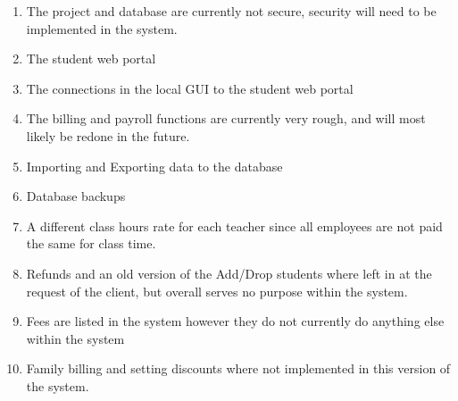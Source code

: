 \begin{enumerate}
\item The project and database are currently not secure, security will need to be implemented in the system.
\item The student web portal
\item The connections in the local GUI to the student web portal
\item The billing and payroll functions are currently very rough, and will most likely be redone in the future.
\item Importing and Exporting data to the database
\item Database backups
\item A different class hours rate for each teacher since all employees are not paid the same for class time.
\item Refunds and an old version of the Add/Drop students where left in at the request of the client, but overall serves no purpose within the system.
\item Fees are listed in the system however they do not currently do anything else within the system
\item Family billing and setting discounts where not implemented in this version of the system.
\end{enumerate}


